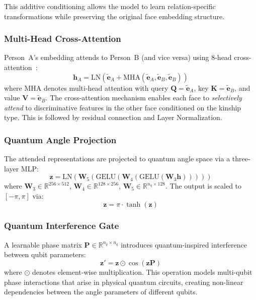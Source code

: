 \documentclass[journal,12pt]{IEEEtran}
\begin{document}
This additive conditioning allows the model to learn relation-specific
transformations while preserving the original face embedding structure.

\subsubsection{Multi-Head Cross-Attention}
Person~A's embedding attends to Person~B (and vice versa) using
8-head cross-attention~\cite{vaswani2017attention}:
\begin{equation}
    \mathbf{h}_A = \text{LN}\!\left(\tilde{\mathbf{e}}_A + \text{MHA}(
    \tilde{\mathbf{e}}_A, \tilde{\mathbf{e}}_B, \tilde{\mathbf{e}}_B)\right)
    \label{eq:cross_attn}
\end{equation}
where $\text{MHA}$ denotes multi-head attention with query $\mathbf{Q} =
\tilde{\mathbf{e}}_A$, key $\mathbf{K} = \tilde{\mathbf{e}}_B$, and value
$\mathbf{V} = \tilde{\mathbf{e}}_B$. The cross-attention mechanism enables
each face to \emph{selectively attend} to discriminative features in the
other face conditioned on the kinship type. This is followed by residual
connection and Layer Normalization.

\subsubsection{Quantum Angle Projection}
The attended representations are projected to quantum angle space via a
three-layer MLP:
\begin{equation}
    \mathbf{z} = \text{LN}\!\left(\mathbf{W}_5(\text{GELU}(\mathbf{W}_4(
    \text{GELU}(\mathbf{W}_3 \mathbf{h}))))\right)
\end{equation}
where $\mathbf{W}_3 \in \mathbb{R}^{256 \times 512}$, $\mathbf{W}_4 \in
\mathbb{R}^{128 \times 256}$, $\mathbf{W}_5 \in \mathbb{R}^{n_q \times
128}$. The output is scaled to $[-\pi, \pi]$ via:
\begin{equation}
    \mathbf{z} = \pi \cdot \tanh(\mathbf{z})
    \label{eq:tanh_scale}
\end{equation}

\subsubsection{Quantum Interference Gate}
A learnable phase matrix $\mathbf{P} \in \mathbb{R}^{n_q \times n_q}$
introduces quantum-inspired interference between qubit parameters:
\begin{equation}
    \mathbf{z}' = \mathbf{z} \odot \cos(\mathbf{z} \mathbf{P})
    \label{eq:interference}
\end{equation}
where $\odot$ denotes element-wise multiplication. This operation models
multi-qubit phase interactions that arise in physical quantum circuits,
creating non-linear dependencies between the angle parameters of
different qubits.
\end{document}
